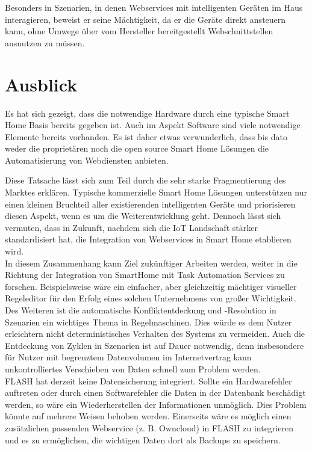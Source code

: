 Besonders in Szenarien, in denen Webservices mit intelligenten Geräten im Haus interagieren, beweist er seine Mächtigkeit, da er die Geräte direkt ansteuern kann, ohne Umwege über vom Hersteller bereitgestellt Webschnittstellen ausnutzen zu müssen. 






\section{Ausblick}
Es hat sich gezeigt, dass die notwendige Hardware durch eine typische Smart Home Basis bereits gegeben ist. Auch im Aspekt Software sind viele notwendige Elemente bereits vorhanden. Es ist daher etwas verwunderlich, dass bis dato weder die proprietären noch die open source Smart Home Lösungen die Automatisierung von Webdiensten anbieten. 

Diese Tatsache lässt sich zum Teil durch die sehr starke Fragmentierung des Marktes erklären. Typische kommerzielle Smart Home Lösungen unterstützen nur einen kleinen Bruchteil aller existierenden intelligenten Geräte und priorisieren diesen Aspekt, wenn es um die Weiterentwicklung geht. Dennoch lässt sich vermuten, dass in Zukunft, nachdem sich die IoT Landschaft stärker standardisiert hat, die Integration von Webservices in Smart Home etablieren wird.\\

In diesem Zusammenhang kann Ziel zukünftiger Arbeiten werden, weiter in die Richtung der Integration von SmartHome mit Task Automation Services zu forschen. Beispielsweise wäre ein einfacher, aber gleichzeitig mächtiger visueller Regeleditor für den Erfolg eines solchen Unternehmens von großer Wichtigkeit. \\

Des Weiteren ist die automatische Konfliktentdeckung und -Resolution in Szenarien ein wichtiges Thema in Regelmaschinen. Dies würde es dem Nutzer erleichtern nicht deterministisches Verhalten des Systems zu vermeiden. Auch die Entdeckung von Zyklen in Szenarien ist auf Dauer notwendig, denn insbesondere für Nutzer mit begrenztem Datenvolumen im Internetvertrag kann unkontrolliertes Verschieben von Daten schnell zum Problem werden.\\

FLASH hat derzeit keine Datensicherung integriert. Sollte ein Hardwarefehler auftreten oder durch einen Softwarefehler die Daten in der Datenbank beschädigt werden, so wäre ein Wiederherstellen der Informationen unmöglich. Dies Problem könnte auf mehrere Weisen behoben werden. Einerseits wäre es möglich einen zusätzlichen passenden Webservice (z. B. Owncloud) in FLASH zu integrieren und es zu ermöglichen, die wichtigen Daten dort als Backups zu speichern. 

